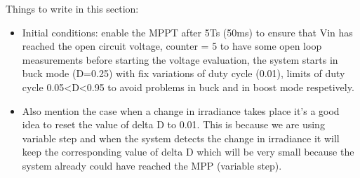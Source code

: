 Things to write in this section:
\begin{itemize}
	
	\item Initial conditions: enable the MPPT after 5Ts (50ms) to ensure that Vin has reached the open circuit voltage, counter = 5 to have some open loop measurements before starting the voltage evaluation, the system starts in buck mode (D=0.25) with fix variations of duty cycle (0.01), limits of duty cycle 0.05<D<0.95 to avoid problems in buck and in boost mode respetively. 
	\item Also mention the case when a change in irradiance takes place it's a good idea to reset the value of delta D to 0.01. This is because we are using variable step and when the system detects the change in irradiance it will keep the corresponding value of delta D which will be very small because the system already could have reached the MPP (variable step). 
\end{itemize}



